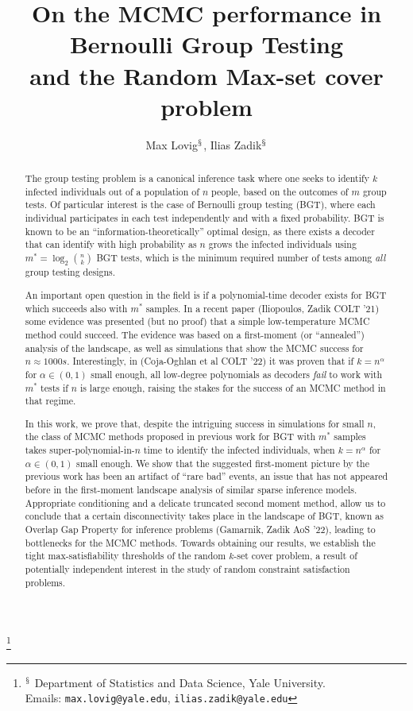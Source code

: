 \documentclass[12pt,reqno]{amsart}
\numberwithin{equation}{section}
\theoremstyle{definition}
\renewcommand{\[}{\begin{equation}}
\renewcommand{\]}{\end{equation}}
\renewcommand{\|}{\bigg{|}}
\begin{document}
\title[On the MCMC performance in Bernoulli Group Testing]{On the MCMC performance in Bernoulli Group Testing\\ and the Random Max-set cover problem}

\author[M. Lovig, I. Zadik]{Max Lovig$^\mathsection$, Ilias Zadik$^\mathsection$}
\thanks{
$^\mathsection$ Department of Statistics and Data Science, Yale University.\\ Emails:  \texttt{max.lovig@yale.edu}, \texttt{ilias.zadik@yale.edu}}


\begin{abstract}%
The group testing problem is a canonical inference task where one seeks to identify $k$ infected individuals out of a population of $n$ people, based on the outcomes of $m$ group tests. Of particular interest is the case of Bernoulli group testing (BGT), where each individual participates in each test independently and with a fixed probability. BGT is known to be an ``information-theoretically'' optimal design, as there exists a decoder that can identify with high probability as $n$ grows the infected individuals using $m^*=\log_2 \binom{n}{k}$ BGT tests, which is the minimum required number of tests among \emph{all} group testing designs. 

An important open question in the field is if a polynomial-time decoder exists for BGT which succeeds also with $m^*$ samples. In a recent paper (Iliopoulos, Zadik COLT '21) some evidence was presented (but no proof) that a simple low-temperature MCMC method could succeed. The evidence was based on a first-moment (or ``annealed'') analysis of the landscape, as well as simulations that show the MCMC success for $n \approx 1000s$. Interestingly, in (Coja-Oghlan et al COLT '22) it was proven that if $k=n^{\alpha}$ for $\alpha \in (0,1)$ small enough, all low-degree polynomials as decoders \emph{fail} to work with $m^*$ tests if $n$ is large enough, raising the stakes for the success of an MCMC method in that regime.

In this work, we prove that, despite the intriguing success in simulations for small $n$, the class of MCMC methods proposed in previous work for BGT with $m^*$ samples takes super-polynomial-in-$n$ time to identify the infected individuals, when $k=n^{\alpha}$ for $\alpha \in (0,1)$ small enough. We show that the suggested first-moment picture by the previous work has been an artifact of ``rare bad'' events, an issue that has not appeared before in the first-moment landscape analysis of similar sparse inference models. Appropriate conditioning and a delicate truncated second moment method, allow us to conclude that a certain disconnectivity takes place in the landscape of BGT, known as Overlap Gap Property for inference problems (Gamarnik, Zadik AoS '22), leading to bottlenecks for the MCMC methods. Towards obtaining our results, we establish the tight max-satisfiability thresholds of the random $k$-set cover problem, a result of potentially independent interest in the study of random constraint satisfaction problems.
\end{abstract}
\end{document}

